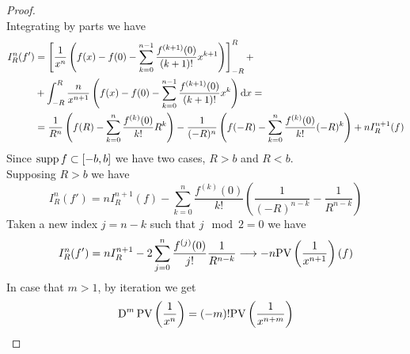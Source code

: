 \documentclass[../complete.tex]{subfiles}
\begin{document}
\begin{proof}
\begin{equation*}
	\end{equation*}
	Integrating by parts we have
	\begin{equation*}
		\begin{aligned}
			I_R^n(f')&=\left[ \frac{1}{x^n}\left( f(x)-f(0)-\sum_{k=0}^{n-1}\frac{f^{(k+1)}(0)}{(k+1)!}x^{k+1} \right) \right]^R_{-R}+\\
			&+\int_{-R}^{R}\frac{n}{x^{n+1}}\left( f(x)-f(0)-\sum_{k=0}^{n-1}\frac{f^{(k+1)}(0)}{(k+1)!}x^k \right)\diff x=\\
			&=\frac{1}{R^n}\left( f(R)-\sum_{k=0}^{n}\frac{f^{(k)}(0)}{k!}R^k \right)-\frac{1}{(-R)^n}\left( f(-R)-\sum_{k=0}^{n}\frac{f^{(k)}(0)}{k!}(-R)^k \right)+nI_R^{n+1}(f)
		\end{aligned}
	\end{equation*}
	Since $\supp f\subset[-b,b]$ we have two cases, $R>b$ and $R<b$.\\
	Supposing $R>b$ we have
	\begin{equation*}
		I^n_R(f')=nI^{n+1}_R(f)-\sum_{k=0}^{n}\frac{f^{(k)}(0)}{k!}\left( \frac{1}{(-R)^{n-k}}-\frac{1}{R^{n-k}} \right)
	\end{equation*}
	Taken a new index $j=n-k$ such that $j\mod 2=0$ we have
	\begin{equation*}
		I_R^n(f')=nI_R^{n+1}-2\sum_{j=0}^{n}\frac{f^{(j)}(0)}{j!}\frac{1}{R^{n-k}}\fto-n\cpvdist[n+1](f)
	\end{equation*}
	In case that $m>1$, by iteration we get
	\begin{equation*}
		\D^m\cpvdist=(-m)!\cpvdist[n+m]
	\end{equation*}
\end{proof}
\end{document}
